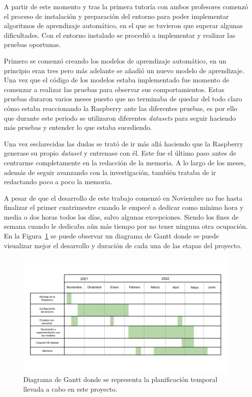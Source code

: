 \documentclass[a4paper, 12pt]{book}
\begin{document}
A partir de este momento y tras la primera tutoría con ambos profesores comenzó el proceso de instalación y preparación del entorno para poder implementar algoritmos de aprendizaje automático, en el que se tuvieron que superar algunas dificultades. Con el entorno instalado se procedió a implementar y realizar las pruebas oportunas.

Primero se comenzó creando los modelos de aprendizaje automático, en un principio eran tres pero más adelante se añadió un nuevo modelo de aprendizaje. Una vez que el código de los modelos estaba implementado fue momento de comenzar a realizar las pruebas para observar sus comportamientos. Estas pruebas duraron varios meses puesto que no terminaba de quedar del todo claro cómo estaba reaccionando la Raspberry ante las diferentes pruebas, es por ello que durante este periodo se utilizaron diferentes \textit{datasets} para seguir haciendo más pruebas y entender lo que estaba sucediendo.

Una vez esclarecidas las dudas se trató de ir más allá haciendo que la Raspberry generase su propio \textit{dataset} y entrenase con él. Este fue el último paso antes de centrarme completamente en la redacción de la memoria. A lo largo de los meses, además de seguir avanzando con la investigación, también trataba de ir redactando poco a poco la memoria.

A pesar de que el desarrollo de este trabajo comenzó en Noviembre no fue hasta finalizar el primer cuatrimestre cuando le empecé a dedicar como mínimo hora y media o dos horas todos los días, salvo algunas excepciones. Siendo los fines de semana cuando le dedicaba aún más tiempo por no tener ninguna otra ocupación. En la Figura~\ref{fig:diagrama_gantt} se puede observar un diagrama de Gantt donde se puede visualizar mejor el desarrollo y duración de cada una de las etapas del proyecto.


\begin{figure}[]
  \centering
  \includegraphics[width=17cm, keepaspectratio]{img/diagrama_GANTT.png}
  \caption{Diagrama de Gantt donde se representa la planificación temporal llevada a cabo en este proyecto.}\label{fig:diagrama_gantt}
\end{figure}
\end{document}
